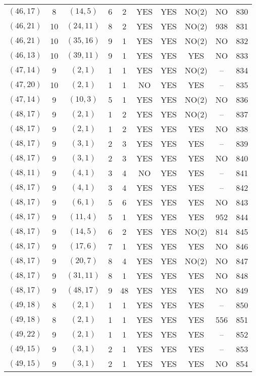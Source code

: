 \begin{longtable}{|c|c|c|c|c|c|c|c|c|c|}
$(46, 17)$ & 8 & $(14, 5)$ & 6 & 2 & YES & YES & NO(2) & NO & 830\\
$(46, 21)$ & 10 & $(24, 11)$ & 8 & 2 & YES & YES & NO(2) & 938 & 831\\
$(46, 21)$ & 10 & $(35, 16)$ & 9 & 1 & YES & YES & NO(2) & NO & 832\\
$(46, 13)$ & 10 & $(39, 11)$ & 9 & 1 & YES & YES & YES & NO & 833\\
$(47, 14)$ & 9 & $(2, 1)$ & 1 & 1 & YES & YES & NO(2) & -- & 834\\
$(47, 20)$ & 10 & $(2, 1)$ & 1 & 1 & NO & YES & YES & -- & 835\\
$(47, 14)$ & 9 & $(10, 3)$ & 5 & 1 & YES & YES & NO(2) & NO & 836\\
$(48, 17)$ & 9 & $(2, 1)$ & 1 & 2 & YES & YES & NO(2) & -- & 837\\
$(48, 17)$ & 9 & $(2, 1)$ & 1 & 2 & YES & YES & YES & NO & 838\\
$(48, 17)$ & 9 & $(3, 1)$ & 2 & 3 & YES & YES & YES & -- & 839\\
$(48, 17)$ & 9 & $(3, 1)$ & 2 & 3 & YES & YES & YES & NO & 840\\
$(48, 11)$ & 9 & $(4, 1)$ & 3 & 4 & NO & YES & YES & -- & 841\\
$(48, 17)$ & 9 & $(4, 1)$ & 3 & 4 & YES & YES & YES & -- & 842\\
$(48, 17)$ & 9 & $(6, 1)$ & 5 & 6 & YES & YES & YES & NO & 843\\
$(48, 17)$ & 9 & $(11, 4)$ & 5 & 1 & YES & YES & YES & 952 & 844\\
$(48, 17)$ & 9 & $(14, 5)$ & 6 & 2 & YES & YES & NO(2) & 814 & 845\\
$(48, 17)$ & 9 & $(17, 6)$ & 7 & 1 & YES & YES & YES & NO & 846\\
$(48, 17)$ & 9 & $(20, 7)$ & 8 & 4 & YES & YES & NO(2) & NO & 847\\
$(48, 17)$ & 9 & $(31, 11)$ & 8 & 1 & YES & YES & YES & NO & 848\\
$(48, 17)$ & 9 & $(48, 17)$ & 9 & 48 & YES & YES & YES & NO & 849\\
$(49, 18)$ & 8 & $(2, 1)$ & 1 & 1 & YES & YES & YES & -- & 850\\
$(49, 18)$ & 8 & $(2, 1)$ & 1 & 1 & YES & YES & YES & 556 & 851\\
$(49, 22)$ & 9 & $(2, 1)$ & 1 & 1 & YES & YES & YES & -- & 852\\
$(49, 15)$ & 9 & $(3, 1)$ & 2 & 1 & YES & YES & YES & -- & 853\\
$(49, 15)$ & 9 & $(3, 1)$ & 2 & 1 & YES & YES & YES & NO & 854\\

\end{longtable}
